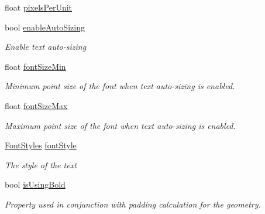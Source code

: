 \begin{DoxyCompactItemize}
float \mbox{\hyperlink{class_t_m_pro_1_1_t_m_p___text_a823fe27650fb51673e5e48ff73384b44}{pixels\+Per\+Unit}}
\item 
bool \mbox{\hyperlink{class_t_m_pro_1_1_t_m_p___text_a883dca142dadf370e7a49e1f4627e88f}{enable\+Auto\+Sizing}}
\begin{DoxyCompactList}\small\item\em Enable text auto-\/sizing \end{DoxyCompactList}\item 
float \mbox{\hyperlink{class_t_m_pro_1_1_t_m_p___text_ab6642b203f0de62e49407ce5caada06d}{font\+Size\+Min}}
\begin{DoxyCompactList}\small\item\em Minimum point size of the font when text auto-\/sizing is enabled. \end{DoxyCompactList}\item 
float \mbox{\hyperlink{class_t_m_pro_1_1_t_m_p___text_ab277a475e80198b4c17e808465d455af}{font\+Size\+Max}}
\begin{DoxyCompactList}\small\item\em Maximum point size of the font when text auto-\/sizing is enabled. \end{DoxyCompactList}\item 
\mbox{\hyperlink{namespace_t_m_pro_aedf79b6e7e2ce2b9c9ac84e790596e7c}{Font\+Styles}} \mbox{\hyperlink{class_t_m_pro_1_1_t_m_p___text_af2e472645f4e0ab2f33ab3236def7dc4}{font\+Style}}
\begin{DoxyCompactList}\small\item\em The style of the text \end{DoxyCompactList}\item 
bool \mbox{\hyperlink{class_t_m_pro_1_1_t_m_p___text_a2ad3845a02f7fd35f5b9bd7a34f5bd52}{is\+Using\+Bold}}
\begin{DoxyCompactList}\small\item\em Property used in conjunction with padding calculation for the geometry. \end{DoxyCompactList}\item 

\end{DoxyCompactItemize}
